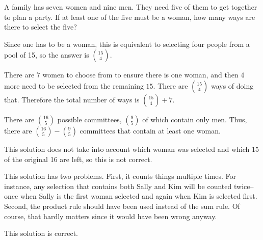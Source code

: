\newpage
\begin{eval}
A family has seven women and nine men.  They need five of them to get together to plan a party.
If at least one of the five must be a woman, how many ways are there to select the five?
\begin{ssolenum}
\item
Since one has to be a woman, this is equivalent to selecting four people from a pool of 15,
so the answer is $\binom{15}{4}$.

\noindent
\evallinetwo
\item
There are $7$ women to choose from to ensure there is one woman, and then $4$ more need
to be selected from the remaining $15$.  There are $\binom{15}{4}$ ways of doing that.
Therefore the total number of ways is $\binom{15}{4}+7$.

\noindent
\evallinetwo
\item
There are $\binom{16}{5}$ possible committees, $\binom{9}{5}$ of which contain only men.
Thus, there are $\binom{16}{5}-\binom{9}{5}$ committees that contain at least one woman.

\noindent
\evallinetwo
\end{ssolenum}
\begin{answer}
\begin{solevalenum}
\item
This solution does not take into account which woman was selected 
and which 15 of the original 16 are left, so this is not correct.
\item
This solution has two problems.  First, it counts things multiple times.  For instance,
any selection that contains both Sally and Kim will be counted twice--once
when Sally is the first woman selected and again when Kim is selected first.
Second, the product rule should have been used instead of the sum rule.  Of course, that
hardly matters since it would have been wrong anyway.
\item
This solution is correct.
\end{solevalenum}
\end{answer}
\end{eval}


